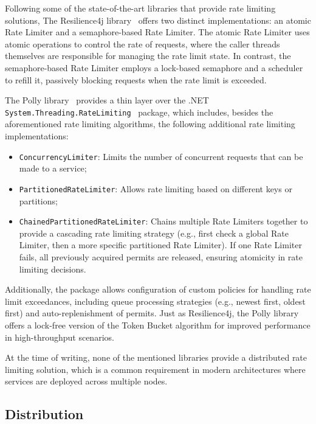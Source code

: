 Following some of the state-of-the-art libraries that provide rate limiting solutions,
The Resilience4j library~\cite{resilience4j} offers two distinct implementations: an atomic Rate Limiter and a semaphore-based Rate Limiter.
The atomic Rate Limiter uses atomic operations to control the rate of requests,
where the caller threads themselves are responsible for managing the rate limit state.
In contrast, the semaphore-based Rate Limiter employs a lock-based semaphore and a scheduler to refill it,
passively blocking requests when the rate limit is exceeded.

The Polly library~\cite{polly-dotnet} provides a thin layer over the .NET \texttt{System.Threading.RateLimiting}~\cite{microsoft-rate-limiting-dotnet} package, which includes, besides the aforementioned rate limiting algorithms, the following additional rate limiting implementations:
\begin{itemize}
    \item \texttt{ConcurrencyLimiter}: Limits the number of concurrent requests that can be made to a service;
    \item \texttt{PartitionedRateLimiter}: Allows rate limiting based on different keys or partitions;
    \item \texttt{ChainedPartitionedRateLimiter}:
    Chains multiple Rate Limiters together to provide a cascading rate limiting strategy (e.g., first check a global Rate Limiter, then a more specific partitioned Rate Limiter).
    If one Rate Limiter fails, all previously acquired permits are released, ensuring atomicity in rate limiting decisions.
\end{itemize}

Additionally, the package allows configuration of custom policies for handling rate limit exceedances, including queue processing strategies (e.g., newest first, oldest first) and auto-replenishment of permits.
Just as Resilience4j, the Polly library offers a lock-free version of the Token Bucket algorithm for improved performance in high-throughput scenarios.

At the time of writing, none of the mentioned libraries provide a distributed rate limiting solution,
which is a common requirement in modern architectures where services are deployed across multiple nodes.

\subsection{Distribution}\label{subsec:rate-limiter-distribution}

